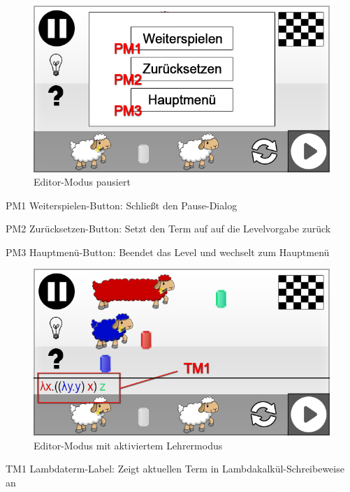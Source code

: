 \begin{figure}[H]
\centering
\includegraphics[scale=0.55]{../gui/_jpeg_numeration/game_paused.jpg}
\caption{Editor-Modus pausiert}
\label{fig:Editor-Modus_Paused}
\end{figure}
\begin{description*}
\item[PM1] Weiterspielen-Button: Schließt den Pause-Dialog
\item[PM2] Zurücksetzen-Button: Setzt den Term auf auf die Levelvorgabe zurück
\item[PM3] Hauptmenü-Button: Beendet das Level und wechselt zum Hauptmenü
\end{description*}


\begin{figure}[H]
\centering
\includegraphics[scale=0.55]{../gui/_jpeg_numeration/game_teachermode.jpg}
\caption{Editor-Modus mit aktiviertem Lehrermodus}
\label{fig:Editor-Modus_TM}
\end{figure}
\begin{description*}
\item[TM1] Lambdaterm-Label: Zeigt aktuellen Term in Lambdakalkül-Schreibeweise an
\end{description*}

